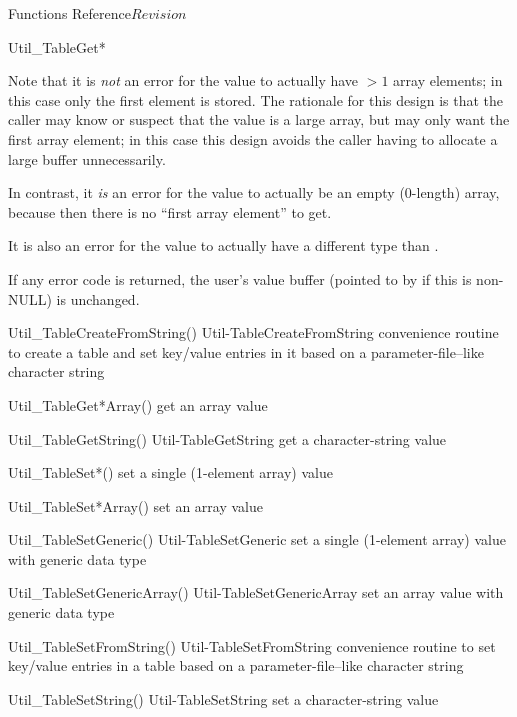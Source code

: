 \begin{cactuspart}{ Functions Reference}{}{$Revision$}
\begin{FunctionDescription}{Util\_TableGet*}
\begin{Discussion}
Note that it is {\em not\/} an error for the value to actually have
$> 1$ array elements; in this case only the first element is stored.
The rationale for this design is that the caller may know or suspect
that the value is a large array, but may only want the first array
element; in this case this design avoids the caller having to allocate
a large buffer unnecessarily.

In contrast, it {\em is\/} an error for the value to actually be an
empty (0-length) array, because then there is no ``first array element''
to get.

It is also an error for the value to actually have a different type
than .

If any error code is returned, the user's value buffer
(pointed to by  if this is non-NULL) is unchanged.
\end{Discussion}

\begin{SeeAlsoSection}
\begin{SeeAlso2} {Util\_TableCreateFromString()} {Util-TableCreateFromString}
convenience routine to create a table and set key/value entries
in it based on a parameter-file--like character string
\end{SeeAlso2}
\begin{SeeAlso}{Util\_TableGet*Array()}
get an array value
\end{SeeAlso}
\begin{SeeAlso2} {Util\_TableGetString()} {Util-TableGetString}
get a character-string value
\end{SeeAlso2}
\begin{SeeAlso}{Util\_TableSet*()}
set a single (1-element array) value
\end{SeeAlso}
\begin{SeeAlso}{Util\_TableSet*Array()}
set an array value
\end{SeeAlso}
\begin{SeeAlso2} {Util\_TableSetGeneric()} {Util-TableSetGeneric}
set a single (1-element array) value with generic data type
\end{SeeAlso2}
\begin{SeeAlso2} {Util\_TableSetGenericArray()} {Util-TableSetGenericArray}
set an array value with generic data type
\end{SeeAlso2}
\begin{SeeAlso2} {Util\_TableSetFromString()} {Util-TableSetFromString}
convenience routine to set key/value entries in a table based on a
parameter-file--like character string
\end{SeeAlso2}
\begin{SeeAlso2} {Util\_TableSetString()} {Util-TableSetString}
set a character-string value
\end{SeeAlso2}
\end{SeeAlsoSection}


\end{FunctionDescription}
\end{cactuspart}
